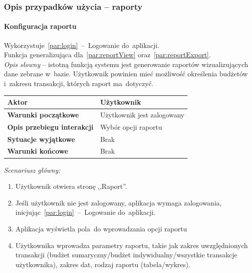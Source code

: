 \subsubsection{Opis przypadków użycia -- raporty}


\paragraph{Konfiguracja raportu\newline}
\label{par:reportConfig}
Wykorzystuje~\ref{par:login}~--~Logowanie do~aplikacji.\\
\indent Funkcja generalizująca dla~\ref{par:reportView} oraz~\ref{par:reportExport}.\\

\textit{Opis słowny} -- istotną funkcją systemu jest generowanie raportów wizualizujących dane zebrane w~bazie. Użytkownik powinien mieć możliwość określenia budżetów i~zakresu transakcji, których raport ma~dotyczyć.

\begin{longtable}{|p{5cm}|p{7cm}|}
  \hline \textbf{Aktor} & Użytkownik \\
  \hline \textbf{Warunki początkowe} & Użytkownik jest zalogowany \\
  \hline \textbf{Opis przebiegu interakcji} & Wybór opcji raportu \\
  \hline \textbf{Sytuacje wyjątkowe} & Brak \\
  \hline \textbf{Warunki końcowe} & Brak \\
  \hline
\end{longtable}

\noindent \textit{Scenariusz główny:}
\begin{enumerate}
  \item Użytkownik otwiera stronę ,,Raport''.
  \item Jeśli użytkownik nie jest zalogowany, aplikacja wymaga zalogowania, inicjując~\ref{par:login}~--~Logowanie do~aplikacji.
  \item Aplikacja wyświetla pola~do wprowadzania opcji raportu
  \item Użytkownika wprowadza parametry raportu, takie jak zakres uwzględnionych transakcji (budżet sumaryczny/budżet indywidualny/wszystkie transakcje użytkownika), zakres dat, rodzaj raportu (tabela/wykres).
\end{enumerate}

